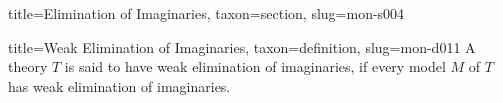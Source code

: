 \documentclass[a4paper]{article}
\begin{document}
\begin{tree}{title={Elimination of Imaginaries}, taxon={section}, slug={mon-s004}}
\begin{tree}{title={Weak Elimination of Imaginaries}, taxon={definition}, slug={mon-d011}}
    A theory \(T\) is said to have weak elimination of imaginaries, if every model \(M\) of \(T\) has weak elimination of imaginaries.

\end{tree}

\end{tree}


\printbibliography
\end{document}
